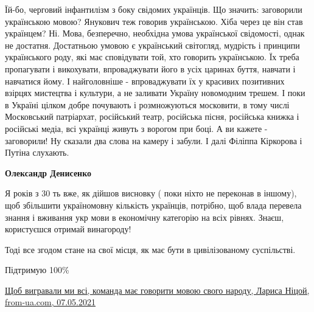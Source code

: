 \begin{itemize}
Їй-бо, черговий інфантилізм з боку свідомих українців. Що значить: заговорили
українською мовою? Янукович теж говорив українською. Хіба через це він став
українцем? Ні. Мова, безперечно, необхідна умова української свідомості, однак
не достатня. Достатньою умовою є український світогляд, мудрість і принципи
українського роду, які має сповідувати той, хто говорить українською. Їх треба
пропагувати і викохувати, впроваджувати його в усіх царинах буття, навчати і
навчатися йому. І найголовніше - впроваджувати їх у красивих позитивних взірцях
мистецтва і культури, а не заливати Україну новомодним трешем. І поки в Україні
цілком добре почувають і розмножуються московити, в тому числі Московський
патріархат, російський театр, російська пісня, російська книжка і російські
медіа, всі українці живуть з ворогом при боці. А ви кажете - заговорили! Ну
сказали два слова на камеру і забули. І далі Філіппа Кіркорова і Путіна
слухають.

\begin{itemize}
 
\textbf{Олександр Денисенко} 

Я років з 30 ть вже, як дійшов висновку ( поки ніхто не переконав в іншому),
щоб збільшити україномовну кількість українців, потрібно, щоб влада перевела
знання і вживання укр мови в економічну категорію на всіх рівнях. Знаєш,
користуєшся отримай винагороду!

Тоді все згодом стане на свої місця, як має бути в цивілізованому суспільстві.

\end{itemize}

 
Підтримую 100\%

 

\href{https://from.ua/schob-vigravali-mi-vsi-komanda-mae-govoriti-movoyu-svogo-narodu}{%
Щоб вигравали ми всі, команда має говорити мовою свого народу, Лариса Ніцой, from-ua.com, 07.05.2021%
}


\end{itemize}
